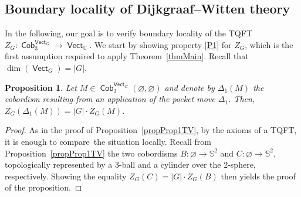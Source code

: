 \documentclass[10pt,a4paper]{amsart}
\DeclareMathOperator{\vect}{\mathsf{Vect}}
\DeclareMathOperator{\C}{\mathbb{C}}
\DeclareMathOperator{\Cob}{\mathsf{Cob}}
\numberwithin{equation}{section}
\newtheorem{Proposition}[Proposition]{Proposition}
\theoremstyle{definition}
\begin{document}
\subsection{Boundary locality of Dijkgraaf--Witten theory}
\label{subSecDWProp}
In the following, our goal is to verify boundary locality of the TQFT $Z_G\colon \Cob_3^{\vect_G} \rightarrow \vect_{\C}$. We start by showing property \ref{P1} for $Z_G$, which is the first assumption required to apply Theorem~\ref{thmMain}. Recall that $\dim (\vect_G) = |G|$.
\begin{Proposition}
 \label{propDW1}
 Let $M \in \Cob_3^{\vect_G}(\varnothing, \varnothing)$ and denote by $\Delta_1(M)$ the cobordism resulting from an application of the pocket move $\Delta_1$. Then, $Z_G(\Delta_1(M)) = |G| \cdot Z_G(M)$.
\end{Proposition}
\begin{proof}
 As in the proof of Proposition~\ref{propProp1TV}, by the axioms of a TQFT, it is enough to compare~the situation locally. Recall from Proposition~\ref{propProp1TV} the two cobordisms $B\colon \varnothing \rightarrow \mathbb{S}^2$ and $C\colon \varnothing \rightarrow \mathbb{S}^2$, topologically represented by a 3-ball and a cylinder over the 2-sphere, respectively. Showing the equality $Z_G(C) = |G|\cdot Z_G(B)$ then yields the proof of the proposition.


\end{proof}
\end{document}
